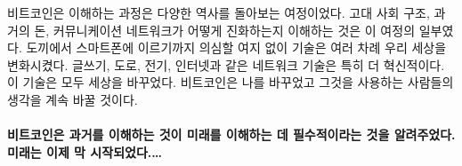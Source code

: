 \begin{comment}
	My quest of trying to make sense of Bitcoin has led me down the pathways
	of history in more ways than one. Understanding ancient societal
	structures, past monies, and how communication networks evolved were all
	part of the journey. From the handaxe to the smartphone, technology has
	undoubtedly changed our world many times over. Networked technologies
	are especially transformational: writing, roads, electricity, the
	internet. All of them changed the world. Bitcoin has changed mine and
	will continue to change the minds and hearts of those who dare to use
	it.
\end{comment}
비트코인은 이해하는 과정은 다양한 역사를 돌아보는 여정이었다.
고대 사회 구조, 과거의 돈, 커뮤니케이션 네트워크가 어떻게 진화하는지 이해하는 것은 
이 여정의 일부였다.
도끼에서 스마트폰에 이르기까지 의심할 여지 없이 기술은 여러 차례 우리 세상을 변화시켰다.
글쓰기, 도로, 전기, 인터넷과 같은 네트워크 기술은 특히 더 혁신적이다.
이 기술은 모두 세상을 바꾸었다. 
비트코인은 나를 바꾸었고 그것을 사용하는 사람들의 생각을 계속 바꿀 것이다.

\paragraph{비트코인은 과거를 이해하는 것이 미래를 이해하는 데 필수적이라는 것을 알려주었다. 미래는 이제 막 시작되었다.\ldots}

